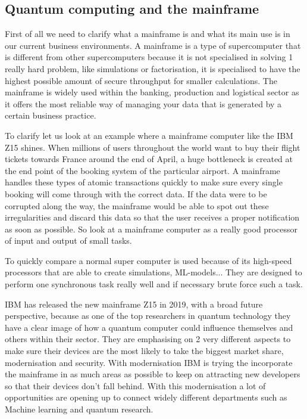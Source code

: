 \subsection{Quantum computing and the mainframe}

First of all we need to clarify what a mainframe is and what its main use is in our current business environments. A mainframe is a type of supercomputer that is different from other supercomputers because it is not specialised in solving 1 really hard problem, like simulations or factorisation, it is specialised to have the highest possible amount of secure throughput for smaller calculations. The mainframe is widely used within the banking, production and logistical sector as it offers the most reliable way of managing your data that is generated by a certain business practice.

To clarify let us look at an example where a mainframe computer like the IBM Z15 shines. When millions of users throughout the world want to buy their flight tickets towards France around the end of April, a huge bottleneck is created at the end point of the booking system of the particular airport. A mainframe handles these types of atomic transactions quickly to make sure every single booking will come through with the correct data. If the data were to be corrupted along the way, the mainframe would be able to spot out these irregularities and discard this data so that the user receives a proper notification as soon as possible. So look at a mainframe computer as a really good processor of input and output of small tasks.

To quickly compare a normal super computer is used because of its high-speed processors that are able to create simulations, ML-models... They are designed to perform one synchronous task really well and if necessary brute force such a task.

IBM has released the new mainframe Z15 in 2019, with a broad future perspective, because as one of the top researchers in quantum technology they have a clear image of how a quantum computer could influence themselves and others within their sector.
They are emphasising on 2 very different aspects to make sure their devices are the most likely to take the biggest market share, modernisation and security. 
With modernisation IBM is trying the incorporate the mainframe in as much areas as possible to keep on attracting new developers so that their devices don't fall behind. With this modernisation a lot of opportunities are opening up to connect widely different departments such as Machine learning and quantum research.

